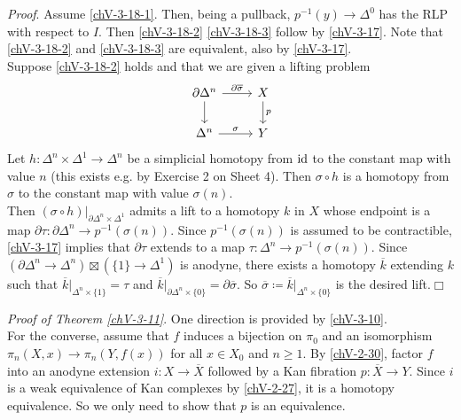         \emph{Proof}. Assume \ref{chV-3-18-1}. Then, being a pullback, $p^{-1}(y) \to \Delta^0$ has the RLP with respect to $I$. Then \ref{chV-3-18-2} \ref{chV-3-18-3} follow by \ref{chV-3-17}. Note that \ref{chV-3-18-2} and \ref{chV-3-18-3} are equivalent, also by \ref{chV-3-17}.\\
        Suppose \ref{chV-3-18-2} holds and that we are given a lifting problem
        \begin{equation*}
            \begin{tikzcd}
                \partial \Delta^n \arrow[d] \arrow[r, "\partial \overline{\sigma}"] & X \arrow[d, "p"] \\
                \Delta^n \arrow[r, "\sigma"] & Y
            \end{tikzcd}
        \end{equation*}
        Let $h \colon \Delta^n \times \Delta^1 \to \Delta^n$ be a simplicial homotopy from $\operatorname{id}$ to the constant map with value $n$ (this exists e.g. by Exercise 2 on Sheet 4). Then $\sigma \circ h$ is a homotopy  from $\sigma$ to the constant map with value $\sigma(n)$.\\
        Then ${(\sigma \circ h)|}_{\partial \Delta^n \times \Delta^1}$ admits a lift to a homotopy $k$ in $X$ whose endpoint is a map $\partial \tau \colon \partial \Delta^n \to p^{-1}(\sigma(n))$. Since $p^{-1}(\sigma(n))$ is assumed to be contractible, \ref{chV-3-17} implies that $\partial \tau$ extends to a map $\tau \colon \Delta^n \to p^{-1}(\sigma(n))$. Since $(\partial \Delta^n \to \Delta^n) \boxtimes (\{1\} \to \Delta^1)$ is anodyne, there exists a homotopy $\overline{k}$ extending $k$ such that ${\overline{k}|}_{\Delta^n \times \{1\}} = \tau$ and ${\overline{k}|}_{\partial \Delta^n \times \{0\}} = \partial \overline{\sigma}$. So $\overline{\sigma} \coloneq {\overline{k}|}_{\Delta^n \times \{0\}}$ is the desired lift.\hfill$\Box$
        \medskip

        \emph{Proof of Theorem \ref{chV-3-11}}. One direction is provided by \ref{chV-3-10}.\\
        For the converse, assume that $f$ induces a bijection on $\pi_0$ and an isomorphism $\pi_n(X, x) \to \pi_n(Y, f(x))$ for all $x \in X_0$ and $n \geq 1$. By \ref{chV-2-30}, factor $f$ into an anodyne extension $i \colon X \to \overline{X}$ followed by a Kan fibration $p \colon \overline{X} \to Y$. Since $i$ is a weak equivalence of Kan complexes by \ref{chV-2-27}, it is a homotopy equivalence. So we only need to show that $p$ is an equivalence.


